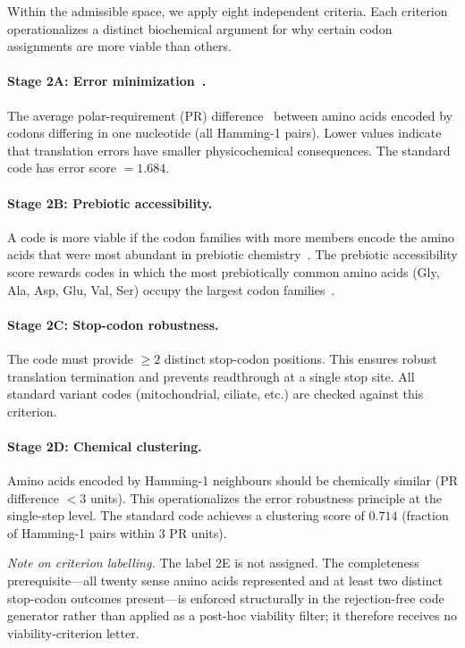 \documentclass[10pt,twocolumn]{article}
\begin{document}
Within the admissible space, we apply eight independent criteria. Each
criterion operationalizes a distinct biochemical argument for why certain
codon assignments are more viable than others.

\paragraph{Stage 2A: Error minimization~\cite{FreelandHurst1998}.}
The average polar-requirement (PR) difference~\cite{Woese1965} between amino
acids encoded by codons differing in one nucleotide (all Hamming-1 pairs).
Lower values indicate that translation errors have smaller physicochemical
consequences. The standard code has error score $= 1.684$.

\paragraph{Stage 2B: Prebiotic accessibility.}
A code is more viable if the codon families with more members encode the amino
acids that were most abundant in prebiotic chemistry~\cite{Miller1953,Cronin1993}.
The prebiotic accessibility score rewards codes in which the most prebiotically
common amino acids (Gly, Ala, Asp, Glu, Val, Ser) occupy the largest codon
families~\cite{KnightFLS1999}.

\paragraph{Stage 2C: Stop-codon robustness.}
The code must provide $\geq 2$ distinct stop-codon positions. This ensures
robust translation termination and prevents readthrough at a single stop site.
All standard variant codes (mitochondrial, ciliate, etc.) are checked against
this criterion.

\paragraph{Stage 2D: Chemical clustering.}
Amino acids encoded by Hamming-1 neighbours should be chemically similar
(PR difference $<3$ units). This operationalizes the error robustness principle
at the single-step level. The standard code achieves a clustering score of
$0.714$ (fraction of Hamming-1 pairs within 3 PR units).

\noindent\textit{Note on criterion labelling.} The label 2E is not assigned.
The completeness prerequisite---all twenty sense amino acids represented and at
least two distinct stop-codon outcomes present---is enforced structurally in
the rejection-free code generator rather than applied as a post-hoc viability
filter; it therefore receives no viability-criterion letter.
\end{document}
